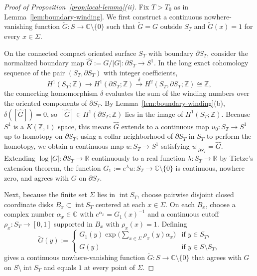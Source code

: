 \documentclass[11pt,a4paper]{amsart}
\numberwithin{equation}{section}
\theoremstyle{definition}
\newcommand{\R}{\mathbb{R}}
\newcommand{\C}{\mathbb{C}}
\newcommand{\Z}{\mathbb{Z}}
\newcommand{\inte}{\operatorname{int}}
\begin{document}
\begin{proof}[Proof of Proposition~\ref{prop:local-lemma}(ii)]
Fix $T > T_0$ as in Lemma~\ref{lem:boundary-winding}. We first construct a continuous nowhere-vanishing function $\widetilde G : S \to \C \setminus \{0\}$ such that $\widetilde G = G$ outside $S_T$ and $\widetilde G(x) = 1$ for every $x \in \Sigma$.

On the connected compact oriented surface $S_T$ with boundary $\partial S_T$, consider the normalized boundary map $\widehat G := G/|G| : \partial S_T \to S^1$. In the long exact cohomology sequence of the pair $(S_T, \partial S_T)$ with integer coefficients,
\[
H^1(S_T; \Z) \longrightarrow H^1(\partial S_T; \Z) \xrightarrow{\;\delta\;} H^2(S_T, \partial S_T; \Z) \cong \Z,
\]
the connecting homomorphism $\delta$ evaluates the sum of the winding numbers over the oriented components of $\partial S_T$. By Lemma~\ref{lem:boundary-winding}(b), $\delta([\widehat G]) = 0$, so $[\widehat G] \in H^1(\partial S_T; \Z)$ lies in the image of $H^1(S_T; \Z)$. Because $S^1$ is a $K(\Z, 1)$ space, this means $\widehat G$ extends to a continuous map $u_0 : S_T \to S^1$ up to homotopy on $\partial S_T$; using a collar neighborhood of $\partial S_T$ in $S_T$ to perform the homotopy, we obtain a continuous map $u : S_T \to S^1$ satisfying $u|_{\partial S_T} = \widehat G$. Extending $\log |G| : \partial S_T \to \R$ continuously to a real function $\lambda : S_T \to \R$ by Tietze's extension theorem, the function $G_1 := e^\lambda u : S_T \to \C \setminus \{0\}$ is continuous, nowhere zero, and agrees with $G$ on $\partial S_T$.

Next, because the finite set $\Sigma$ lies in $\inte S_T$, choose pairwise disjoint closed coordinate disks $B_x \subset \inte S_T$ centered at each $x \in \Sigma$. On each $B_x$, choose a complex number $\alpha_x \in \C$ with $e^{\alpha_x} = G_1(x)^{-1}$ and a continuous cutoff $\rho_x : S_T \to [0,1]$ supported in $B_x$ with $\rho_x(x) = 1$. Defining
\[
\widetilde G(y) :=
\begin{cases}
G_1(y) \exp\bigl(\sum_{x \in \Sigma} \rho_x(y) \alpha_x\bigr) & \text{if } y \in S_T, \\
G(y) & \text{if } y \in S \setminus S_T,
\end{cases}
\]
gives a continuous nowhere-vanishing function $\widetilde G : S \to \C \setminus \{0\}$ that agrees with $G$ on $S \setminus \inte S_T$ and equals $1$ at every point of $\Sigma$.


\end{proof}
\end{document}
